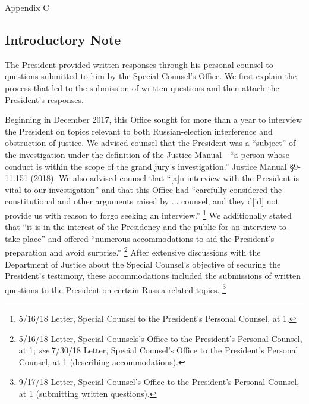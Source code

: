 
\thispagestyle{empty}

\vspace*{15em}

\begin{center}

\Huge
Appendix C

\end{center}

\newpage

\subsection{Introductory Note}

The President provided written responses through his personal counsel to questions submitted to him by the Special Counsel’s Office. We first explain the process that led to the submission of written questions and then attach the President’s responses.

Beginning in December 2017, this Office sought for more than a year to interview the President on topics relevant to both Russian-election interference and obstruction-of-justice.
We advised counsel that the President was a “subject” of the investigation under the definition of the Justice Manual---“a person whose conduct is within the scope of the grand jury’s investigation.”
Justice Manual \S 9-11.151 (2018).
We also advised counsel that “[a]n interview with the President is vital to our investigation” and that this Office had “carefully considered the constitutional and other arguments raised by ... counsel, and they d[id] not provide us with reason to forgo seeking an interview.”%
\footnote{5/16/18 Letter, Special Counsel to the President’s Personal Counsel, at 1.}
We additionally stated that “it is in the interest of the Presidency and the public for an interview to take place” and offered “numerous accommodations to aid the President’s preparation and avoid surprise.”%
\footnote{5/16/18 Letter, Special Counsels’s Office to the President’s Personal Counsel, at 1;
\textit{see} 7/30/18 Letter, Special Counsel’s Office to the President’s Personal Counsel, at 1 (describing accommodations).}
After extensive discussions with the Department of Justice about the Special Counsel’s objective of securing the President’s testimony, these accommodations included the submissions of written questions to the President on certain Russia-related topics.%
\footnote{9/17/18 Letter, Special Counsel’s Office to the President’s Personal Counsel, at 1 (submitting written questions).}

